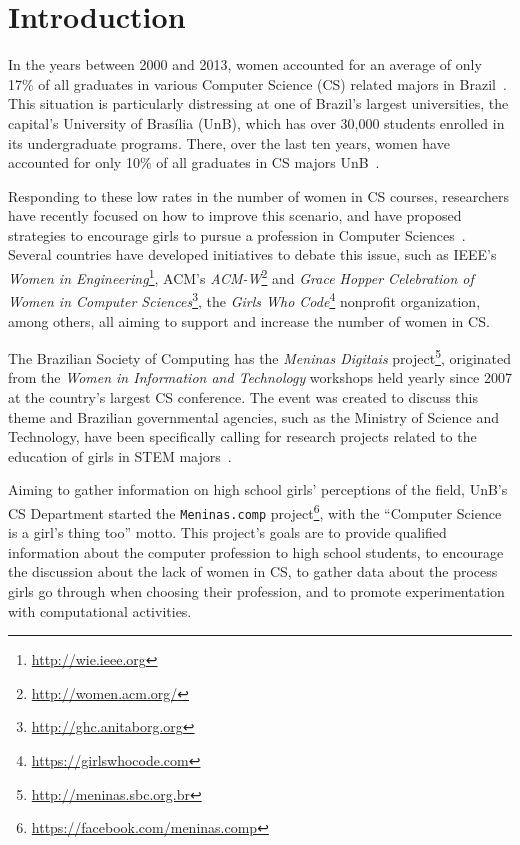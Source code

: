\section{Introduction}\label{sec:intro}%

In the years between 2000 and 2013, women accounted for an average of only 17\% of all graduates in various Computer Science (CS) related majors in Brazil~\cite{maia_2016}. This situation is particularly distressing at one of Brazil's largest universities, the capital's University of Bras\'{i}lia (UnB), which has over 30,000 students enrolled in its undergraduate programs. There, over the last ten years, women have accounted for only 10\% of all graduates in CS majors UnB~\cite{couto_2014}.

Responding to these low rates in the number of women in CS courses, researchers have recently focused on how to improve this scenario, and have proposed strategies to encourage girls to pursue a profession in Computer Sciences~\cite{maia_2016,couto_2014,cohoon_2002,gurer_2002}. Several countries have developed initiatives to debate this issue, such as IEEE's \emph{Women in Engineering}\footnote{\url{http://wie.ieee.org}}, ACM's \emph{ACM-W}\footnote{\url{http://women.acm.org/}} and \emph{Grace Hopper Celebration of Women in Computer Sciences}\footnote{\url{http://ghc.anitaborg.org}}, the \emph{Girls Who Code}\footnote{\url{https://girlswhocode.com}} nonprofit organization, among others, all aiming to support and increase the number of women in CS.

The Brazilian Society of Computing has the \emph{Meninas Digitais} project\footnote{\url{http://meninas.sbc.org.br}}, originated from the \emph{Women in Information and Technology} workshops held yearly since 2007 at the country's largest CS conference. The event was created to discuss this theme and Brazilian governmental agencies, such as the Ministry of Science and Technology, have been specifically calling for research projects related to the education of girls in STEM majors~\cite{cnpq_2017}.

Aiming to gather information on high school girls' perceptions of the field, UnB's CS Department started the \texttt{Meninas.comp} project\footnote{\url{https://facebook.com/meninas.comp}}, with the ``Computer Science is a girl's thing too'' motto. This project's goals are to provide qualified information about the computer profession to high school students, to encourage the discussion about the lack of women in CS, to gather data about the process girls go through when choosing their profession, and to promote experimentation with computational activities.

